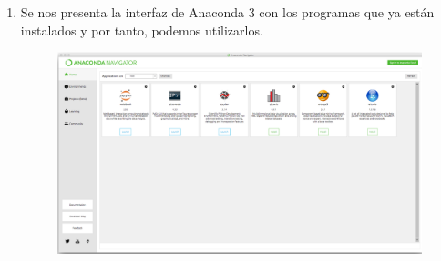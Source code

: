 \documentclass[12pt]{article}
\begin{document}
\begin{enumerate}
\begin{figure}[H]
\end{figure}
\item Se nos presenta la interfaz de Anaconda 3 con los programas que ya están instalados y por tanto, podemos utilizarlos.
\begin{figure}[H]
	\centering
	\includegraphics[scale=0.15]{Imagenes/Instalacion_Anaconda_01_iOS_13} 
\end{figure}
\end{enumerate}
\end{document}
